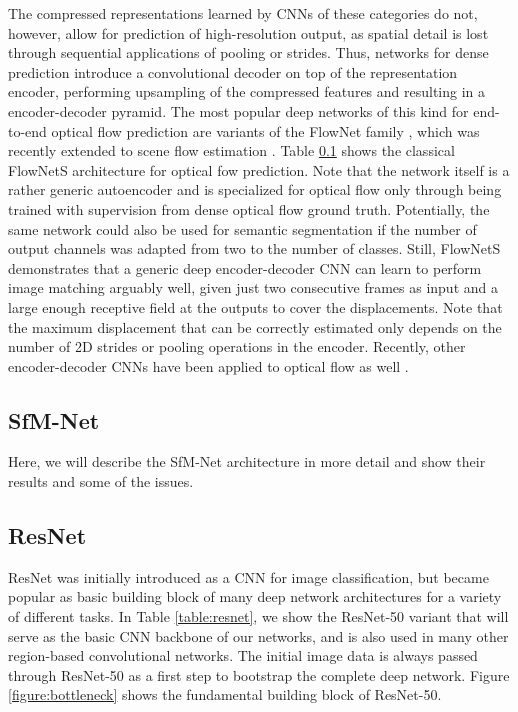 The compressed representations learned by CNNs of these categories do not, however, allow
for prediction of high-resolution output, as spatial detail is lost through sequential applications
of pooling or strides.
Thus, networks for dense prediction introduce a convolutional decoder on top of the representation encoder,
performing upsampling of the compressed features and resulting in a encoder-decoder pyramid.
The most popular deep networks of this kind for end-to-end optical flow prediction
are variants of the FlowNet family \cite{FlowNet, FlowNet2},
which was recently extended to scene flow estimation \cite{SceneFlowDataset}.
Table \ref{} shows the classical FlowNetS architecture for optical fow prediction.
Note that the network itself is a rather generic autoencoder and is specialized for optical flow only through being trained
with supervision from dense optical flow ground truth.
Potentially, the same network could also be used for semantic segmentation if
the number of output channels was adapted from two to the number of classes. %
Still, FlowNetS demonstrates that a generic deep encoder-decoder CNN can learn to perform image matching arguably well,
given just two consecutive frames as input and a large enough receptive field at the outputs to cover the displacements.
Note that the maximum displacement that can be correctly estimated only depends on the number of 2D strides or pooling
operations in the encoder.
Recently, other encoder-decoder CNNs have been applied to optical flow as well \cite{DenseNetDenseFlow}.

\subsection{SfM-Net}
Here, we will describe the SfM-Net \cite{SfmNet} architecture in more detail and show their results
and some of the issues.

\subsection{ResNet}
\label{ssec:resnet}
ResNet \cite{ResNet} was initially introduced as a CNN for image classification, but
became popular as basic building block of many deep network architectures for a variety
of different tasks. In Table \ref{table:resnet}, we show the ResNet-50 variant
that will serve as the basic CNN backbone of our networks, and
is also used in many other region-based convolutional networks.
The initial image data is always passed through ResNet-50 as a first step to
bootstrap the complete deep network.
Figure \ref{figure:bottleneck}
shows the fundamental building block of ResNet-50.

